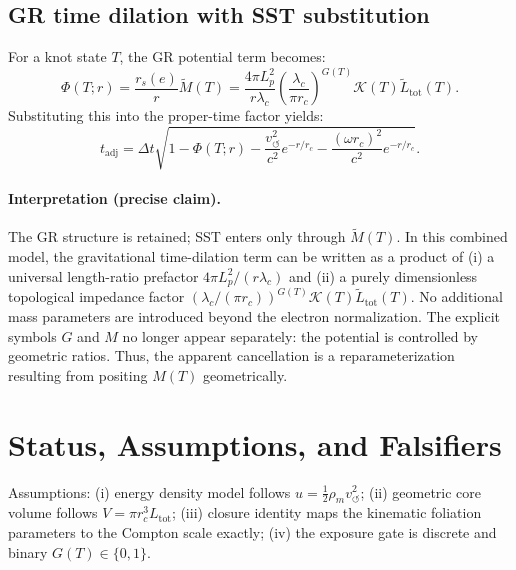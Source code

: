 \documentclass[11pt, a4paper]{article}
\begin{document}
            \subsection{GR time dilation with SST substitution}
                For a knot state $T$, the GR potential term becomes:
                \begin{equation}
                    \Phi(T;r) = \frac{r_s(e)}{r}\tilde{M}(T) = \frac{4\pi L_p^2}{r\lambda_c} \left( \frac{\lambda_c}{\pi r_c} \right)^{G(T)} \mathcal{K}(T) \tilde{L}_{\mathrm{tot}}(T).
                \end{equation}
                Substituting this into the proper-time factor yields:
                \begin{equation}
                    t_{\mathrm{adj}} = \Delta t \sqrt{ 1-\Phi(T;r) -\frac{v_{\circlearrowleft}^2}{c^2}e^{-r/r_c} -\frac{(\omega r_c)^2}{c^2}e^{-r/r_c} }.
                \end{equation}
                
                \paragraph{Interpretation (precise claim).}
                    The GR structure is retained; SST enters only through $\tilde{M}(T)$. In this combined model, the gravitational time-dilation term can be written as a product of (i) a universal length-ratio prefactor $4\pi L_p^2/(r\lambda_c)$ and (ii) a purely dimensionless topological impedance factor $\left(\lambda_c/(\pi r_c)\right)^{G(T)}\mathcal{K}(T)\tilde{L}_{\mathrm{tot}}(T)$. No additional mass parameters are introduced beyond the electron normalization. The explicit symbols $G$ and $M$ no longer appear separately: the potential is controlled by geometric ratios. Thus, the apparent cancellation is a reparameterization resulting from positing $M(T)$ geometrically.
        
        \section{Status, Assumptions, and Falsifiers}
        
        Assumptions: (i) energy density model follows $u = \frac{1}{2}\rho_m v_{\circlearrowleft}^2$; (ii) geometric core volume follows $V = \pi r_c^3 L_{\mathrm{tot}}$; (iii) closure identity maps the kinematic foliation parameters to the Compton scale exactly; (iv) the exposure gate is discrete and binary $G(T)\in\{0,1\}$.
        
\end{document}
